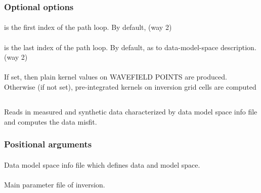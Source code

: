 \subsubsection{Optional options}
\paragraph{ }
 is the first index of the path loop. By default,  (way 2)
\paragraph{ }
 is the last index of the path loop. By default, 
 as to data-model-space description. (way 2)
\paragraph{}
If set, then plain kernel values on WAVEFIELD POINTS are produced. Otherwise (if not set), pre-integrated kernels on inversion grid cells are computed
%
%
\subsection{} \label{programs_scripts,sec:bin_prog,sec:comp_misfit}
Reads in measured and synthetic data characterized by data model space info file and computes the data misfit.

\subsubsection{Positional arguments}
\paragraph{}
Data model space info file which defines data and model space.
\paragraph{}
Main parameter file of inversion.
